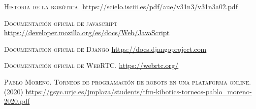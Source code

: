 \documentclass[a4paper, 12pt]{book}
\begin{document}
\cleardoublepage

\begin{thebibliography}{X}
	 \textsc{Historia de la robótica.}
	\url{https://scielo.isciii.es/pdf/aue/v31n3/v31n3a02.pdf}
	
	 \textsc{Documentación oficial de javascript}
	\url{https://developer.mozilla.org/es/docs/Web/JavaScript}	
	
	 \textsc{Documentacion oficial de Django}
	\url{https://docs.djangoproject.com}	
	
	 \textsc{Documentación oficial de WebRTC.}
	\url{https://webrtc.org/}
	
	
	 \textsc{Pablo Moreno. Torneos de programación de robots
en una plataforma online. (2020)}
	\url{https://gsyc.urjc.es/jmplaza/students/tfm-kibotics-torneos-pablo_moreno-2020.pdf}
	
	\bibitem{} \textsc{}
	\url{}
\end{thebibliography}
\end{document}
